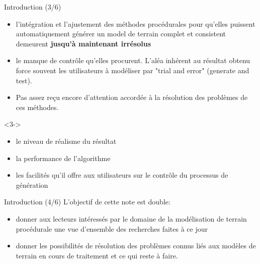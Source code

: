 \documentclass{beamer}
\begin{document}
\begin{frame}{Introduction (3/6)}

\begin{itemize}
	\item l'intégration et l'ajustement des méthodes procédurales pour qu'elles puissent automatiquement générer un model de terrain complet et consistent demeurent \textbf{jusqu'à maintenant irrésolus}
	\item le manque de contrôle qu'elles procurent. L'aléa inhérent au résultat obtenu force souvent les utilisateurs à modéliser par "trial and error" (generate and test).
	\item Pas assez reçu encore d'attention accordée à la résolution des problèmes de ces méthodes. \newline
\end{itemize}


\begin{uncoverenv}<3->
\begin{itemize}
	\item le niveau de réalisme du résultat
	\item la performance de l'algorithme
	\item les facilités qu'il offre aux utilisateurs sur le contrôle du processus de génération\newline
\end{itemize}
\end{uncoverenv}

\end{frame}

\begin{frame}{Introduction (4/6)}
L'objectif de cette note est double:

\begin{itemize}
	\item<2-> donner aux lecteurs intéressés par le domaine de la modélisation de terrain procédurale une vue d'ensemble des recherches faites à ce jour
	\item<3-> donner les possibilités de résolution des problèmes connus liés aux modèles de terrain en cours de traitement et ce qui reste à faire.\newline
\end{itemize}

\newline

\newline

\end{frame}
	
\end{document}
